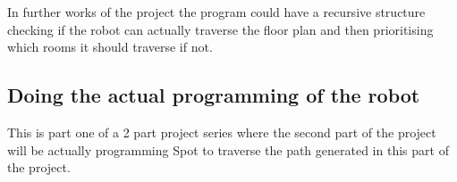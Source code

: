 In further works of the project the program could have a recursive structure checking if the robot can actually traverse the floor plan and then prioritising which rooms it should traverse if not.


\subsection{Doing the actual programming of the robot}
This is part one of a 2 part project series where the second part of the project will be actually programming Spot to traverse the path generated in this part of the project.

